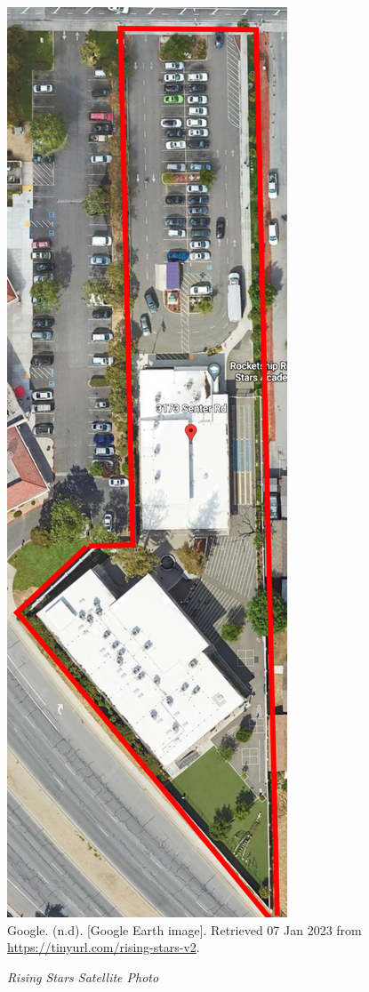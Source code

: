 \begin{figure}[hbtp]
  \centering
  \caption[Rising Stars Satellite Photo]{\textit{Rising Stars Satellite Photo}}\label{fig:rising-stars-sat-photo}
  \includegraphics[height=0.667\textheight]{Satellite-Photos/rising-stars-sat-photo}\\ %
  \footnotesize{Google. (n.d). [Google Earth image]. Retrieved 07 Jan 2023 from \url{https://tinyurl.com/rising-stars-v2}.}
\end{figure}


